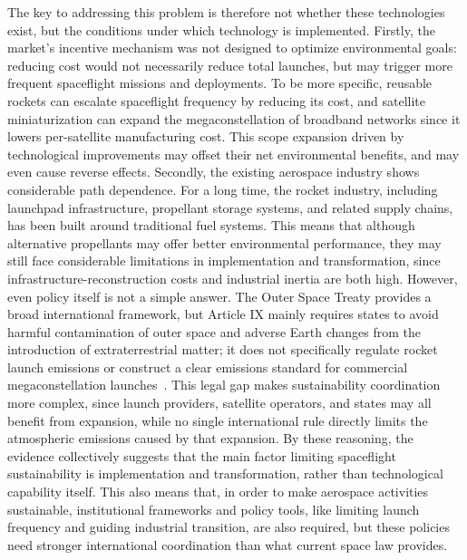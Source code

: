 \documentclass[12pt]{article}
\begin{document}
The key to addressing this problem is therefore not whether these technologies exist, but the conditions under which technology is implemented. Firstly, the market's incentive mechanism was not designed to optimize environmental goals: reducing cost would not necessarily reduce total launches, but may trigger more frequent spaceflight missions and deployments. To be more specific, reusable rockets can escalate spaceflight frequency by reducing its cost, and satellite miniaturization can expand the megaconstellation of broadband networks since it lowers per-satellite manufacturing cost. This scope expansion driven by technological improvements may offset their net environmental benefits, and may even cause reverse effects. Secondly, the existing aerospace industry shows considerable path dependence. For a long time, the rocket industry, including launchpad infrastructure, propellant storage systems, and related supply chains, has been built around traditional fuel systems. This means that although alternative propellants may offer better environmental performance, they may still face considerable limitations in implementation and transformation, since infrastructure-reconstruction costs and industrial inertia are both high. However, even policy itself is not a simple answer. The Outer Space Treaty provides a broad international framework, but Article IX mainly requires states to avoid harmful contamination of outer space and adverse Earth changes from the introduction of extraterrestrial matter; it does not specifically regulate rocket launch emissions or construct a clear emissions standard for commercial megaconstellation launches~\citep[art.~IX]{un1967outerspacetreaty}. This legal gap makes sustainability coordination more complex, since launch providers, satellite operators, and states may all benefit from expansion, while no single international rule directly limits the atmospheric emissions caused by that expansion. By these reasoning, the evidence collectively suggests that the main factor limiting spaceflight sustainability is implementation and transformation, rather than technological capability itself. This also means that, in order to make aerospace activities sustainable, institutional frameworks and policy tools, like limiting launch frequency and guiding industrial transition, are also required, but these policies need stronger international coordination than what current space law provides.
\end{document}
